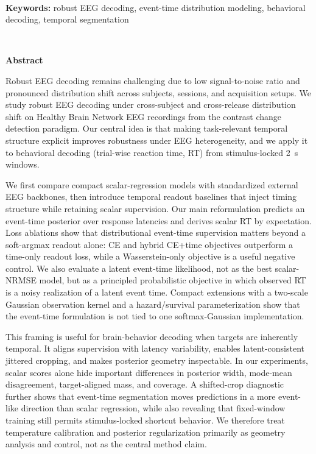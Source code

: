\documentclass[12pt]{article}
\begin{document}
\ \\[-2mm]
{\bf Keywords:} robust EEG decoding, event-time distribution modeling, behavioral decoding, temporal segmentation

\thispagestyle{empty}
%
\ \vspace{-0mm}\\
%
\begin{center} {\bf Abstract} \end{center}



Robust EEG decoding remains challenging due to low signal-to-noise ratio and pronounced distribution shift across
subjects, sessions, and acquisition setups. We study robust EEG decoding under cross-subject and cross-release
distribution shift on Healthy Brain Network EEG recordings from the contrast change detection paradigm. Our central idea
is that making task-relevant temporal structure explicit improves robustness under EEG heterogeneity, and we apply it to behavioral decoding (trial-wise reaction time, RT) from stimulus-locked 2~s windows.


We first compare compact scalar-regression models with standardized external EEG backbones, then introduce temporal
readout baselines that inject timing structure while retaining scalar supervision. Our main reformulation predicts an
event-time posterior over response latencies and derives scalar RT by expectation. Loss ablations show that distributional
event-time supervision matters beyond a soft-argmax readout alone: CE and hybrid CE+time objectives outperform a
time-only readout loss, while a Wasserstein-only objective is a useful negative control. We also evaluate a latent
event-time likelihood, not as the best scalar-NRMSE model, but as a principled probabilistic objective in which observed
RT is a noisy realization of a latent event time. Compact extensions with a two-scale Gaussian observation kernel and a
hazard/survival parameterization show that the event-time formulation is not tied to one softmax-Gaussian implementation.

This framing is useful for brain-behavior decoding when targets are inherently temporal. It aligns supervision with latency variability, enables latent-consistent jittered cropping, and makes posterior geometry inspectable. In our experiments, scalar scores alone hide important differences in posterior width, mode-mean disagreement, target-aligned mass, and coverage. A shifted-crop diagnostic further shows that event-time segmentation moves predictions in a more event-like direction than scalar regression, while also revealing that fixed-window training still permits stimulus-locked shortcut behavior. We therefore treat temperature calibration and posterior regularization primarily as geometry analysis and control, not as the central method claim.
\end{document}
